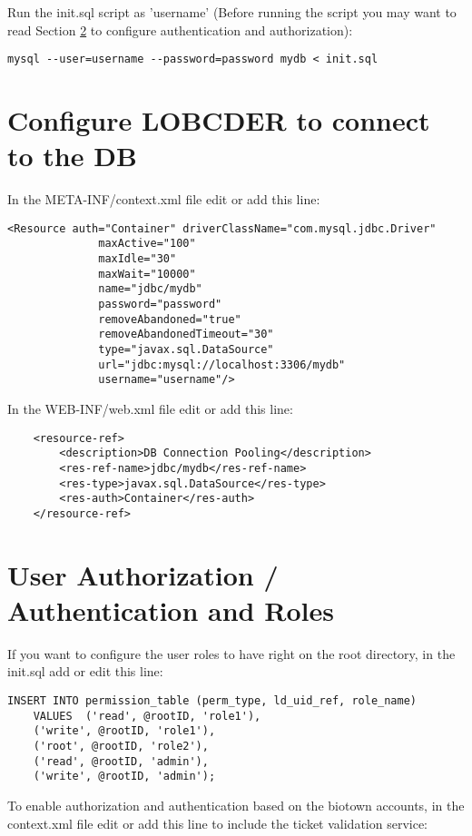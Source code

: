 \documentclass[a4paper,10pt]{article}
\begin{document}
Run the init.sql script as 'username' (Before running the script you may want to read Section \ref{sec:auth} to configure authentication and authorization): 

\begin{lstlisting}
mysql --user=username --password=password mydb < init.sql
\end{lstlisting}

\section{Configure LOBCDER to connect to the DB}
In the META-INF/context.xml file edit or add this line:

\begin{lstlisting}
<Resource auth="Container" driverClassName="com.mysql.jdbc.Driver" 
			  maxActive="100" 
			  maxIdle="30" 
			  maxWait="10000" 
			  name="jdbc/mydb" 
			  password="password"
			  removeAbandoned="true"
			  removeAbandonedTimeout="30" 
			  type="javax.sql.DataSource" 
			  url="jdbc:mysql://localhost:3306/mydb" 
			  username="username"/>
\end{lstlisting}

In the WEB-INF/web.xml file edit or add this line:
\begin{lstlisting}
    <resource-ref>
        <description>DB Connection Pooling</description>
        <res-ref-name>jdbc/mydb</res-ref-name>
        <res-type>javax.sql.DataSource</res-type>
        <res-auth>Container</res-auth>
    </resource-ref>
\end{lstlisting}

\section{User Authorization / Authentication and Roles}\label{sec:auth}

If you want to configure the user roles to have right on the root directory, in the init.sql add or edit this line: 

\begin{lstlisting}
INSERT INTO permission_table (perm_type, ld_uid_ref, role_name) 
	VALUES  ('read', @rootID, 'role1'),
	('write', @rootID, 'role1'),
	('root', @rootID, 'role2'),
	('read', @rootID, 'admin'),
	('write', @rootID, 'admin');
\end{lstlisting}

To enable authorization and authentication based on the biotown accounts, in the context.xml file edit or add this line to include the ticket validation service:
\end{document}
